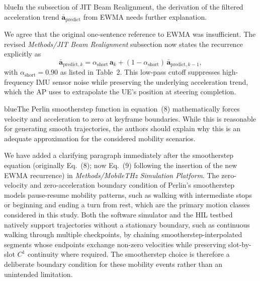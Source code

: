 \documentclass{article}
\newcommand{\blue}[1]{\begin{color}{blue}#1\end{color}}
\begin{document}
\begin{tcbremark}
{\selectfont
\blue{In the subsection of JIT Beam Realignment, the derivation of the filtered acceleration trend $\bar{\mathbf{a}}_{\text{predict}}$ from EWMA needs further explanation.}
}
\end{tcbremark}

\noindent We agree that the original one-sentence reference to EWMA was insufficient. The revised \emph{Methods/JIT Beam Realignment} subsection now states the recurrence explicitly as
\begin{equation}
    \bar{\mathbf{a}}_{\text{predict},k} = \alpha_{\text{short}}\, \mathbf{a}_k + (1 - \alpha_{\text{short}})\, \bar{\mathbf{a}}_{\text{predict},k-1},
\end{equation}
with $\alpha_{\text{short}} = 0.90$ as listed in Table~2. This low-pass cutoff suppresses high-frequency IMU sensor noise while preserving the underlying acceleration trend, which the AP uses to extrapolate the UE's position at steering completion.

\begin{tcbremark}
{\selectfont
\blue{The Perlin smootherstep function in equation~(8) mathematically forces velocity and acceleration to zero at keyframe boundaries. While this is reasonable for generating smooth trajectories, the authors should explain why this is an adequate approximation for the considered mobility scenarios.}
}
\end{tcbremark}

\noindent We have added a clarifying paragraph immediately after the smootherstep equation (originally Eq.~(8); now Eq.~(9) following the insertion of the new EWMA recurrence) in \emph{Methods/MobileTHz Simulation Platform}. The zero-velocity and zero-acceleration boundary condition of Perlin's smootherstep models pause-resume mobility patterns, such as walking with intermediate stops or beginning and ending a turn from rest, which are the primary motion classes considered in this study. Both the software simulator and the HIL testbed natively support trajectories without a stationary boundary, such as continuous walking through multiple checkpoints, by chaining smootherstep-interpolated segments whose endpoints exchange non-zero velocities while preserving slot-by-slot $C^1$ continuity where required. The smootherstep choice is therefore a deliberate boundary condition for these mobility events rather than an unintended limitation.
\end{document}

